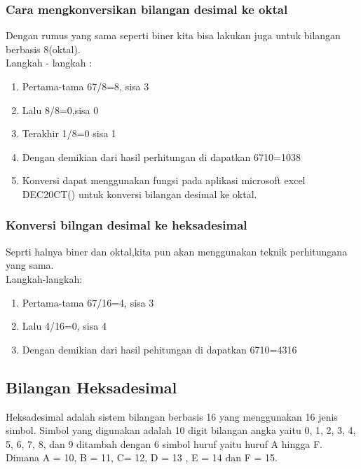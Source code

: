 \subsubsection{Cara mengkonversikan bilangan desimal ke oktal}
Dengan rumus yang sama seperti biner kita bisa lakukan juga untuk bilangan berbasis 8(oktal).
\\Langkah - langkah :
\begin{enumerate}
\item Pertama-tama 67/8=8, sisa 3
\item Lalu 8/8=0,sisa 0
\item Terakhir 1/8=0 sisa 1
\item Dengan demikian dari hasil perhitungan di dapatkan 6710=1038
\item Konversi dapat menggunakan fungsi pada aplikasi microsoft excel DEC20CT() untuk konversi bilangan desimal ke oktal.
\end{enumerate}

\subsubsection{Konversi bilngan desimal ke heksadesimal}
Seprti halnya biner dan oktal,kita pun akan menggunakan teknik perhitungana yang sama.\\

Langkah-langkah:
\begin{enumerate}

\item Pertama-tama 67/16=4, sisa 3
\item Lalu 4/16=0, sisa 4
\item Dengan demikian dari hasil pehitungan di dapatkan 6710=4316
\end{enumerate}

\subsection{Bilangan Heksadesimal}
Heksadesimal adalah sistem bilangan berbasis 16 yang menggunakan 16 jenis simbol. Simbol yang digunakan adalah 10 digit bilangan angka yaitu 0, 1, 2, 3, 4, 5, 6, 7, 8, dan 9 ditambah dengan 6 simbol huruf yaitu huruf A hingga F. Dimana A = 10, B = 11, C= 12, D = 13 , E = 14 dan F = 15.
